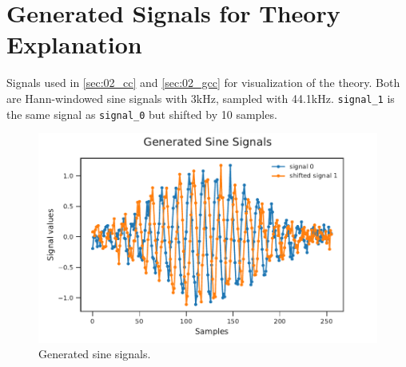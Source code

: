 \section{Generated Signals for Theory Explanation}
\label{appendix:a1_signals}


Signals used in \cref{sec:02_cc} and \cref{sec:02_gcc} for visualization of the theory.
Both are Hann-windowed sine signals with 3\si{\kilo\hertz}, sampled with 44.1\si{\kilo\hertz}.
\lstinline!signal_1! is the same signal as \lstinline!signal_0! but shifted by
10 samples.
\begin{figure}[ht]
	\centering
		\includegraphics[width=1\columnwidth]{figures/signals_theory}
	\caption{Generated sine signals.}
	\label{fig:ap1_signals}
\end{figure}


